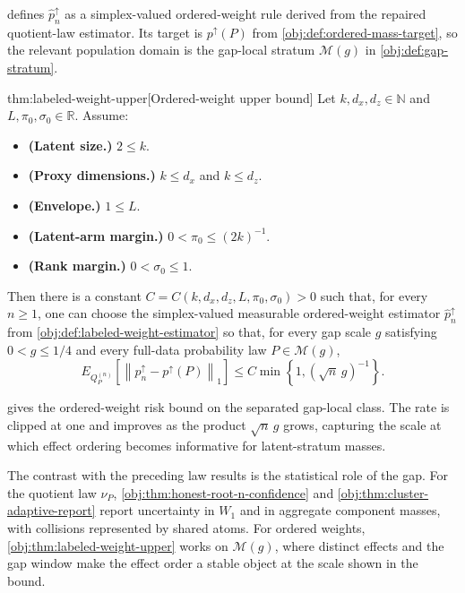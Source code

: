  defines \(\widehat p_n^{\uparrow}\) as a simplex-valued ordered-weight rule derived from the repaired quotient-law estimator. Its target is \(p^{\uparrow}(P)\) from \cref{obj:def:ordered-mass-target}, so the relevant population domain is the gap-local stratum \(\mathcal M(g)\) in \cref{obj:def:gap-stratum}.

\begin{theoremv}{thm:labeled-weight-upper}[Ordered-weight upper bound]
Let \(k,d_x,d_z\in\mathbb N\) and \(L,\pi_0,\sigma_0\in\mathbb R\).  Assume:
\begin{itemize}
\item \textbf{(Latent size.)} \(2\le k\).
\item \textbf{(Proxy dimensions.)} \(k\le d_x\) and \(k\le d_z\).
\item \textbf{(Envelope.)} \(1\le L\).
\item \textbf{(Latent-arm margin.)} \(0<\pi_0\le (2k)^{-1}\).
\item \textbf{(Rank margin.)} \(0<\sigma_0\le 1\).
\end{itemize}
Then there is a constant \(C=C(k,d_x,d_z,L,\pi_0,\sigma_0)>0\) such that, for every \(n\ge1\), one can choose the simplex-valued measurable ordered-weight estimator \(\widehat p_n^{\uparrow}\) from \cref{obj:def:labeled-weight-estimator} so that, for every gap scale \(g\) satisfying \(0<g\le1/4\) and every full-data probability law \(P\in\mathcal M(g)\),
\[
E_{Q_P^{(n)}}\!\left[\left\|\widehat p_n^{\uparrow}-p^{\uparrow}(P)\right\|_1\right]
\le
C\min\left\{1,\left(\sqrt n\,g\right)^{-1}\right\}.
\]
\end{theoremv}

 gives the ordered-weight risk bound on the separated gap-local class. The rate is clipped at one and improves as the product \(\sqrt n\,g\) grows, capturing the scale at which effect ordering becomes informative for latent-stratum masses.

The contrast with the preceding law results is the statistical role of the gap. For the quotient law \(\nu_P\), \cref{obj:thm:honest-root-n-confidence} and \cref{obj:thm:cluster-adaptive-report} report uncertainty in \(W_1\) and in aggregate component masses, with collisions represented by shared atoms. For ordered weights, \cref{obj:thm:labeled-weight-upper} works on \(\mathcal M(g)\), where distinct effects and the gap window make the effect order a stable object at the scale shown in the bound.
